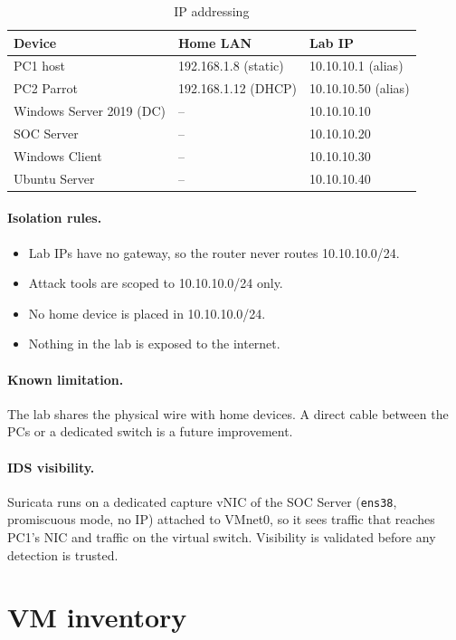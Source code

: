 \documentclass[11pt,a4paper]{article}
\begin{document}
\begin{table}[h]
\centering
\begin{tabular}{lll}
\toprule
Device & Home LAN & Lab IP \\
\midrule
PC1 host & 192.168.1.8 (static) & 10.10.10.1 (alias) \\
PC2 Parrot & 192.168.1.12 (DHCP) & 10.10.10.50 (alias) \\
Windows Server 2019 (DC) & -- & 10.10.10.10 \\
SOC Server & -- & 10.10.10.20 \\
Windows Client & -- & 10.10.10.30 \\
Ubuntu Server & -- & 10.10.10.40 \\
\bottomrule
\end{tabular}
\caption{IP addressing}
\end{table}

\paragraph{Isolation rules.}
\begin{itemize}
  \item Lab IPs have no gateway, so the router never routes 10.10.10.0/24.
  \item Attack tools are scoped to 10.10.10.0/24 only.
  \item No home device is placed in 10.10.10.0/24.
  \item Nothing in the lab is exposed to the internet.
\end{itemize}

\paragraph{Known limitation.} The lab shares the physical wire with home
devices. A direct cable between the PCs or a dedicated switch is a future
improvement.

\paragraph{IDS visibility.} Suricata runs on a dedicated capture vNIC of the SOC Server
(\texttt{ens38}, promiscuous mode, no IP) attached to VMnet0, so it sees traffic that reaches
PC1's NIC and traffic on the virtual switch. Visibility is validated before any
detection is trusted.

\section{VM inventory}
\end{document}
